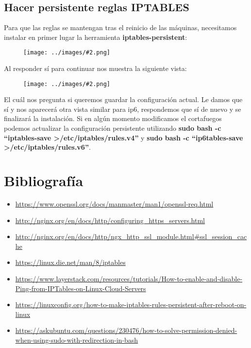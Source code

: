 \documentclass[twoside]{article}
\newcommand{\enquote}[1]{``#1''}
\newcommand{\image}[2]{
\begin{figure}[H]
    \texttt{[image: ../images/\#2.png]}
    \centering
\end{figure}
}
\begin{document}
\subsection{Hacer persistente reglas IPTABLES}
Para que las reglas se mantengan tras el reinicio de las máquinas, necesitamos instalar en primer lugar la herramienta \textbf{iptables-persistent}:
\image{8}{28}
Al responder sí para continuar nos muestra la siguiente vista:
\image{8}{29}
El cuál nos pregunta si queremos guardar la configuración actual. Le damos que sí y nos aparecerá otra vista similar para ip6, respondemos que sí de nuevo y se finalizará la instalación. 
Si en algún momento modificamos el cortafuegos podemos actualizar la configuración persistente utilizando \textbf{sudo bash -c \enquote{iptables-save \textgreater /etc/iptables/rules.v4}} y \textbf{sudo bash -c \enquote{ip6tables-save \textgreater /etc/iptables/rules.v6}}. 

\newpage
\section{Bibliografía}
\begin{itemize}
    \item \url{https://www.openssl.org/docs/manmaster/man1/openssl-req.html}
    \item \url{http://nginx.org/en/docs/http/configuring_https_servers.html}
    \item \url{http://nginx.org/en/docs/http/ngx_http_ssl_module.html#ssl_session_cache}
    \item \url{https://linux.die.net/man/8/iptables}
    \item \url{https://www.layerstack.com/resources/tutorials/How-to-enable-and-disable-Ping-from-IPTables-on-Linux-Cloud-Servers}
    \item \url{https://linuxconfig.org/how-to-make-iptables-rules-persistent-after-reboot-on-linux}
    \item \url{https://askubuntu.com/questions/230476/how-to-solve-permission-denied-when-using-sudo-with-redirection-in-bash}
\end{itemize}
\end{document}
